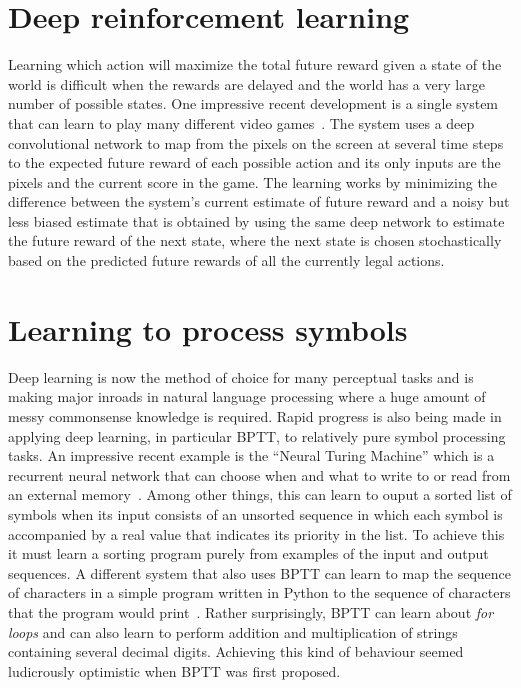 \documentclass[10pts]{article}
\begin{document}
\section{Deep reinforcement learning}

Learning which action will maximize the total future reward given a state
of the world is difficult when the rewards are delayed and the world has a
very large number of possible states. One impressive recent development is
a single system that can learn to play many different video
games~\citep{Deepmind-atari-arxiv2013}. The system uses a deep convolutional network to
map from the pixels on the screen at several time steps to the
expected future reward of each possible action and its only inputs are the
pixels and the current score in the game. The learning works by minimizing
the difference between the system's current estimate of future reward and a
noisy but less biased estimate that is obtained by using the same deep
network to estimate the future reward of the next state, where the next
state is chosen stochastically based on the predicted future rewards of all
the currently legal actions.

\section{Learning to process symbols}

Deep learning is now the method of choice for many perceptual tasks and is
making major inroads in natural language processing where a huge amount of
messy commonsense knowledge is required. Rapid progress is also being made
in applying deep learning, in particular BPTT, to relatively pure symbol processing tasks.
An impressive recent example is the ``Neural Turing Machine'' which is a
recurrent neural network that can choose when and what to write to or read
from an external memory~\citep{Graves-et-al-arxiv2014}. 
Among other things, this can learn to
ouput a sorted list of symbols when its input consists of an unsorted
sequence in which each symbol is accompanied by a real value that indicates
its priority in the list.  To achieve this it must learn a sorting program
purely from examples of the input and output sequences.  A different system
that also uses BPTT can learn to map the sequence of characters in a simple
program written in Python to the sequence of characters that the program
would print~\citep{Zaremba+Sutskever-arxiv2014}. 
Rather surprisingly, BPTT can learn about {\it for
  loops} and can also learn to perform addition and multiplication of
strings containing several decimal digits. Achieving this kind of behaviour
seemed ludicrously optimistic when BPTT was first proposed.
  
\end{document}
